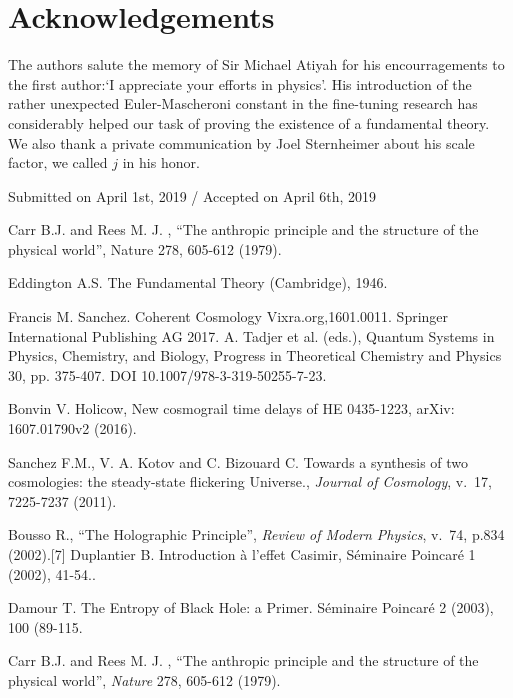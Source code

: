 \documentclass[twoside,draft]{article}
\begin{document}
\begin{sloppypar}
{\section*{Acknowledgements}
The authors salute the memory of Sir Michael Atiyah for his encourragements to the
first author:`I appreciate your efforts in physics'. His introduction of the rather
unexpected Euler-Mascheroni constant in the fine-tuning research has considerably helped our task
of proving the existence of a fundamental theory. We also thank a private communication by Joel Sternheimer about his scale factor, we called $j$ in his honor.
%
\begin{flushright}\footnotesize
Submitted on April 1st, 2019 / Accepted on April 6th, 2019
\end{flushright}


\begin{thebibliography}{99}\footnotesize



 Carr B.J. and Rees M. J. , “The anthropic principle and the structure of the physical world”,
Nature 278, 605-612 (1979). %

 Eddington A.S. The Fundamental Theory (Cambridge), 1946.

 Francis M. Sanchez. Coherent Cosmology Vixra.org,1601.0011. Springer International Publishing AG
2017. A. Tadjer et al. (eds.), Quantum Systems in Physics, Chemistry, and Biology, Progress in
Theoretical Chemistry and Physics 30, pp. 375-407. DOI 10.1007/978-3-319-50255-7-23. %

 Bonvin V. Holicow, New cosmograil time delays of HE 0435-1223, arXiv: 1607.01790v2
(2016). %

 Sanchez F.M., V. A. Kotov and C. Bizouard C. Towards a synthesis of two cosmologies: the
steady-state flickering Universe., \textit{Journal of Cosmology}, v.\, 17, 7225-7237 (2011). %

 Bousso R., “The Holographic Principle”, \textit{Review of Modern Physics}, v.\, 74, p.834 (2002).[7] Duplantier B. Introduction à l'effet Casimir, Séminaire Poincaré 1 (2002), 41-54.. %

 Damour T. The Entropy of Black Hole: a Primer. Séminaire Poincaré 2 (2003), 100 (89-115. %

 Carr B.J. and Rees M. J. , “The anthropic principle and the structure of the physical world”,
\textit{Nature} 278, 605-612 (1979). %


\end{thebibliography}}
\end{sloppypar}
\end{document}
